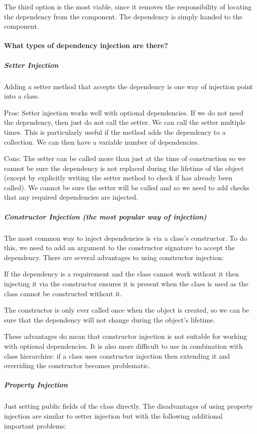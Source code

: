 \documentclass{book}
\begin{document}
    The third option is the most viable, since it removes the responsibility of locating the dependency from the component. The dependency is simply handed to the component.
\paragraph{What types of dependency injection are there?}
\subparagraph{Setter Injection}
    Adding a setter method that accepts the dependency is one way of injection point into a class.

    Pros:
        Setter injection works well with optional dependencies. If we do not need the dependency, then just do not call the setter.
        We can call the setter multiple times. This is particularly useful if the method adds the dependency to a collection. We can then have a variable number of dependencies.

    Cons:
        The setter can be called more than just at the time of construction so we cannot be sure the dependency is not replaced during the lifetime of the object
        (except by explicitly writing the setter method to check if has already been called).
        We cannot be sure the setter will be called and so we need to add checks that any required dependencies are injected.
    \subparagraph{Constructor Injection (the most popular way of injection)}
    The most common way to inject dependencies is via a class's constructor. To do this, we need to add an argument to the constructor signature to accept the dependency.
    There are several advantages to using constructor injection:

        If the dependency is a requirement and the class cannot work without it then injecting it via the constructor ensures it is present
when the class is used as the class cannot be constructed without it.

        The constructor is only ever called once when the object is created, so we can be sure that the dependency will not change during the object's lifetime.

    These advantages do mean that constructor injection is not suitable for working with optional dependencies.
    It is also more difficult to use in combination with class hierarchies:
    if a class uses constructor injection then extending it and overriding the constructor becomes problematic.
    \subparagraph{Property Injection}
    Just setting public fields of the class directly.
    The disadvantages of using property injection are similar to setter injection but with the following additional important problems:
\end{document}
